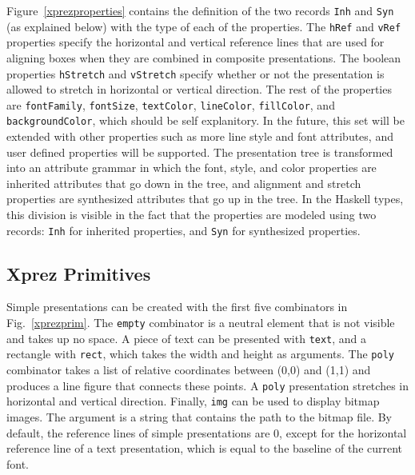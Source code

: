 \noindent Figure~\ref{xprezproperties} contains the definition of the two records \texttt{Inh} and \texttt{Syn} (as explained below) with the type of each of the properties. The \texttt{hRef} and \texttt{vRef} properties specify the horizontal and vertical reference lines that are used for aligning boxes when they are combined in composite presentations. The boolean properties \texttt{hStretch} and \texttt{vStretch} specify whether or not the presentation is allowed to stretch in horizontal or vertical direction. The rest of the properties are \texttt{fontFamily}, \texttt{fontSize}, \texttt{textColor}, \texttt{lineColor}, \texttt{fillColor}, and \texttt{backgroundColor}, which should be self explanitory. In the future, this set will be extended with other properties such as more line style and font attributes, and user defined properties will be supported. The presentation tree is transformed into an attribute grammar in which the font, style, and color properties are inherited attributes that go down in the tree, and alignment and stretch properties are synthesized attributes that go up in the tree. In the Haskell types, this division is visible in the fact that the properties are modeled using two records: \texttt{Inh} for inherited properties, and \texttt{Syn} for synthesized properties.


%																
\subsection{{\sc Xprez} Primitives} \label{primitives}

Simple presentations can be created with the first five combinators in Fig.~\ref{xprezprim}. The \texttt{empty} combinator is a neutral element that is not visible and takes up no space. A piece of text can be presented with \texttt{text}, and a rectangle with \texttt{rect}, which takes the width and height as arguments. The \texttt{poly} combinator takes a list of relative coordinates between (0,0) and (1,1) and produces a line figure that connects these points. A \texttt{poly} presentation stretches in horizontal and vertical direction. Finally, \texttt{img} can be used to display bitmap images. The argument is a string that contains the path to the bitmap file. By default, the reference lines of simple presentations are 0, except for the horizontal reference line of a text presentation, which is equal to the baseline of the current font.

